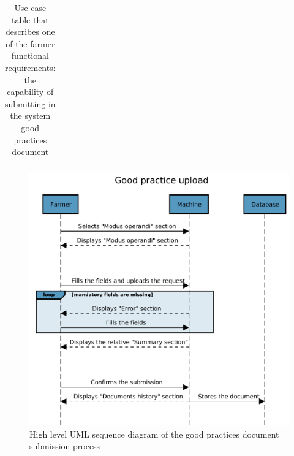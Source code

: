 \begin{table}[H]
\begin{tabular}{|l|p{}|}
    \end{tabular}

\caption{\label{tab:good_practice_submission}Use case table that describes one of the farmer functional requirements: the capability of submitting in the system good practices document}
\end{table}

\begin{figure}[H]
	\centering
    \includegraphics[page=1, width=\textwidth]{Images/SeqDiag/good_practice_seq_diag.pdf}
	\caption{\label{fig:good_practice_seq_diag}High level UML sequence diagram of the good practices document submission process}
\end{figure}


